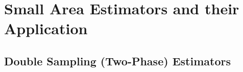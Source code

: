 \documentclass[article]{jss}
\newcommand{\var}{\mathbb{V}}
\begin{document}
% 
% 







































\section[Small Area Estimators and their Application in R]{Small Area Estimators and their Application}
\label{sec:saeest_and_appl}


\subsection{Double Sampling (Two-Phase) Estimators}

%
%
\end{document}

